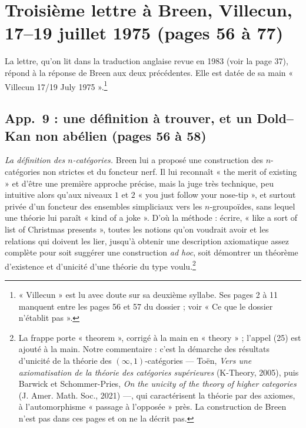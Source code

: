 \documentclass[11pt,a4paper]{article}
\begin{document}
\section*{Troisième lettre à Breen, Villecun, 17--19 juillet 1975 (pages 56 à 77)}

La lettre, qu'on lit dans la traduction anglaise revue en 1983 (voir la
page 37), répond à la réponse de Breen aux deux précédentes. Elle est datée
de sa main « Villecun 17/19 July 1975 ».\footnote{« Villecun » est lu avec
doute sur sa deuxième syllabe. Ses pages 2 à 11 manquent entre les pages 56
et 57 du dossier ; voir « Ce que le dossier n'établit pas ».}

\subsection*{App.~9 : une définition à trouver, et un Dold--Kan non abélien (pages 56 à 58)}

\emph{La définition des $n$-catégories.} Breen lui a proposé une construction
des $n$-catégories non strictes et du foncteur nerf. Il lui reconnaît « the
merit of existing » et d'être une première approche précise, mais la juge
très technique, peu intuitive alors qu'aux niveaux $1$ et $2$ « you just
follow your nose-tip », et surtout privée d'un foncteur des ensembles
simpliciaux vers les $n$-groupoïdes, sans lequel une théorie lui paraît
« kind of a joke ». D'où la méthode : écrire, « like a sort of list of
Christmas presents », toutes les notions qu'on voudrait avoir et les
relations qui doivent les lier, jusqu'à obtenir une description axiomatique
assez complète pour soit suggérer une construction \emph{ad hoc}, soit
démontrer un théorème d'existence et d'unicité d'une théorie du type
voulu.\footnote{La frappe porte « theorem », corrigé à la main en
« theory » ; l'appel (25) est ajouté à la main. Notre commentaire : c'est
la démarche des résultats d'unicité de la théorie des $(\infty,1)$-catégories
--- Toën, \emph{Vers une axiomatisation de la théorie des catégories
supérieures} (K-Theory, 2005), puis Barwick et Schommer-Pries,
\emph{On the unicity of the theory of higher categories} (J. Amer. Math.
Soc., 2021) ---, qui caractérisent la théorie par des axiomes, à l'automorphisme
« passage à l'opposée » près. La construction de Breen n'est pas dans ces
pages et on ne la décrit pas.}
\end{document}
